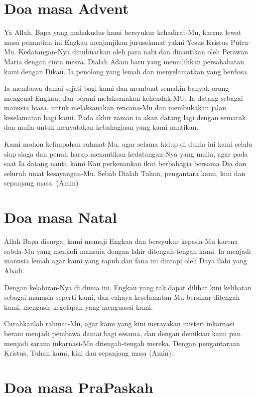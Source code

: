 \section{Doa masa Advent}

    Ya Allah, Bapa yang mahakudus kami bersyukur kehadirat-Mu, karena lewat masa penantian ini Engkau menjanjikan juruselamat yakni Yesus Kristus Putra-Mu. Kedatangan-Nya dinubuatkan oleh para nabi dan dinantikan oleh Perawan Maria dengan cinta mesra. Dialah Adam baru yang memulihkan persahabatan kami dengan Dikau. Ia penolong yang lemah dan menyelamatkan yang berdosa.

    Ia membawa damai sejati bagi kami dan membuat semakin banyak orang mengenal Engkau, dan berani melaksanakan kehendak-MU. Ia datang sebagai manusia biasa, untuk melaksanakan rencana-Mu dan membukakan jalan keselamatan bagi kami. Pada akhir zaman ia akan datang lagi dengan semarak dan mulia untuk menyatakan kebahagiaan yang kami nantikan.

    Kami mohon kelimpahan rahmat-Mu, agar selama hidup di dunia ini kami selalu siap siaga dan penuh harap menantikan kedatangan-Nya yang mulia, agar pada saat Ia datang nanti, kami Kau perkenankan ikut berbahagia bersama Dia dan seluruh umat kesayangan-Mu. Sebab Dialah Tuhan, pengantara kami, kini dan sepanjang masa. (Amin)
    
\section{Doa masa Natal}

    Allah Bapa disurga, kami memuji Engkau dan bersyukur kepada-Mu karena sabda-Mu yang menjadi mansuia dengan lahir ditengah-tengah kami. Ia menjadi manusia lemah agar kami yang rapuh dan fana ini diurapi oleh Daya ilahi yang Abadi.

    Dengan kelahiran-Nya di dunia ini, Engkau yang tak dapat dilihat kini kelihatan sebagai manusia seperti kami, dan cahaya keselamatan-Mu bersinar ditengah kami, mengusir kegelapan yang menguasai kami.

    Curahkanlah rahmat-Mu, agar kami yang kini merayakan misteri inkarnasi berani menjadi pembawa damai bagi sesama, dan dengan demikian kami pun menjadi sarana inkarnasi-Mu ditengah-tengah mereka. Dengan pengantaraan Kristus, Tuhan kami, kini dan sepanjang masa (Amin).
    
\section{Doa masa PraPaskah}    

